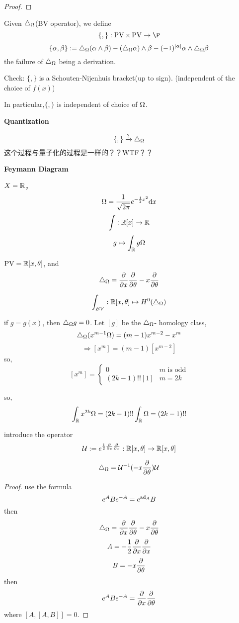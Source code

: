 \begin{proof}
\end{proof}


\begin{definition}
Given $\triangle_{\Omega}$(BV operator), we define
$$\{,\}:\PV\times\PV\to\P$$
$$\{\alpha,\beta\}:=
\triangle_{\Omega}(\alpha\wedge\beta)-(\triangle_{\Omega}\alpha)\wedge\beta-
(-1)^{|\alpha|}\alpha\wedge\triangle_{\Omega}\beta$$
the failure of $\triangle_{\Omega}$ being a derivation. 
\end{definition}
Check: $\{,\}$ is a Schouten-Nijenhuis bracket(up to sign).
(independent of the choice of $f(x)$)

In particular,$\{,\}$ is independent of choice of $\Omega$.

\textbf{Quantization}

$$\{,\}\xrightarrow{?}\triangle_{\Omega}$$
这个过程与量子化的过程是一样的？？WTF？？

\textbf{Feymann Diagram}
\begin{example}
$X=\mathbb{R}$，
$$\Omega=\frac{1}{\sqrt{2\pi}}e^{-\frac{1}{2}x^2}\mathrm{d} x$$
$$\int:\mathbb{R}[x]\to\mathbb{R}$$
$$g\mapsto\int_{\mathbb{R}}g\Omega$$

$\operatorname{PV}=\mathbb{R}[x,\theta]$, and 
$$\triangle_{\Omega}=\frac{\partial } {\partial x}\frac{\partial } {\partial \theta}-x\frac{\partial } {\partial \theta}$$

$$\int_{BV}:\mathbb{R}[x,\theta]\mapsto H^0(\triangle_{\Omega})$$

if $g=g(x)$, then $\triangle_{\Omega}g=0$. Let $[g]$ be the 
$\triangle_{\Omega}$- homology class,
$$\triangle_{\Omega}(x^{m-1}\Omega)
=(m-1)x^{m-2}
-x^m$$
$$\Rightarrow [x^m]=(m-1)[x^{m-2}]$$
so,
$$
[x^m]=
\left\{
  \begin{array}{cc}
    0  &  m \text{ is odd}\\
    (2k-1)!![1]  & m=2k
  \end{array}
\right.
$$

so,
$$\int_{\mathbb{R}}x^{2k}\Omega=
(2k-1)!!\int_{\mathbb{R}}\Omega=(2k-1)!!$$

\end{example}

introduce the operator 
$$\mathcal{U}:=
  e^{\frac{1}{2}\frac{\partial } {\partial x}\frac{\partial } {\partial x}}:
  \mathbb{R}[x,\theta]\to\mathbb{R}[x,\theta]
$$

\begin{lemma}
$$\triangle_{\Omega}=\mathcal{U}^{-1}(-x\frac{\partial } {\partial \theta})\mathcal{U}$$
\end{lemma}
\begin{proof}
use the formula
$$e^ABe^{-A}=e^{\operatorname{ad}_A}B$$
then
$$\triangle_{\Omega}=\frac{\partial } {\partial x}\frac{\partial } {\partial \theta}-x\frac{\partial } {\partial \theta}
$$
$$A=-\frac{1}{2}\frac{\partial } {\partial x}\frac{\partial } {\partial x}$$
$$B=-x\frac{\partial } {\partial \theta}$$
then 
$$e^ABe^{-A}=\frac{\partial } {\partial x}\frac{\partial } {\partial \theta}$$
where $[A,[A,B]]=0$.
\end{proof}

